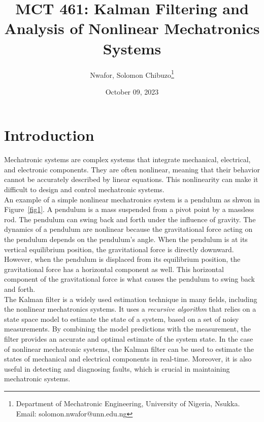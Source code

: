 \documentclass{article}
\title{MCT 461: Kalman Filtering and Analysis of Nonlinear Mechatronics Systems}
\author{Nwafor, Solomon Chibuzo\footnote{Department of Mechatronic Engineering, University of Nigeria, Nsukka.\\ Email: solomon.nwafor@unn.edu.ng}}
\date{October 09, 2023}
\begin{document}
\maketitle

\section{Introduction}
Mechatronic systems are complex systems that integrate mechanical, electrical, and electronic components. They are often nonlinear, meaning that their behavior cannot be accurately described by linear equations. This nonlinearity can make it difficult to design and control mechatronic systems.\\
\indent An example of a simple nonlinear mechatronics system is a pendulum as shwon in Figure~\ref{fig1}. A pendulum is a mass suspended from a pivot point by a massless rod. The pendulum can swing back and forth under the influence of gravity. The dynamics of a pendulum are nonlinear because the gravitational force acting on the pendulum depends on the pendulum's angle. When the pendulum is at its vertical equilibrium position, the gravitational force is directly downward. However, when the pendulum is displaced from its equilibrium position, the gravitational force has a horizontal component as well. This horizontal component of the gravitational force is what causes the pendulum to swing back and forth.\\
\indent The Kalman filter is a widely used estimation technique in many fields, including the nonlinear mechatronics systems. It uses a \emph{recursive algorithm} that relies on a state space model to estimate the state of a system, based on a set of noisy measurements. By combining the model predictions with the measurement, the filter provides an accurate and optimal estimate of the system state. In the case of nonlinear mechatronic systems, the Kalman filter can be used to estimate the states of mechanical and electrical components in real-time. Moreover, it is also useful in detecting and diagnosing faults, which is crucial in maintaining mechatronic systems.
\\
\end{document}
